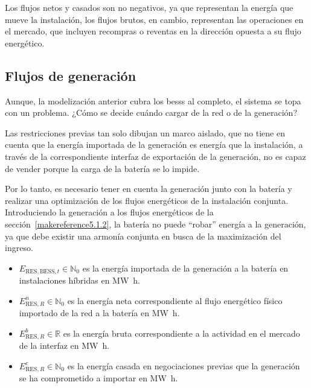 Los flujos netos y casados son no negativos, ya que representan la energía que mueve la instalación, los flujos brutos, en cambio, representan las operaciones en el mercado, que incluyen recompras o reventas en la dirección opuesta a su flujo energético.

\subsection{Flujos de generación}
\label{makereference5.1.3}

Aunque, la modelización anterior cubra los \glspl{bess} al completo, el sistema se topa con un problema. ¿Cómo se decide cuándo cargar de la red o de la generación?

Las restricciones previas tan solo dibujan un marco aislado, que no tiene en cuenta que la energía importada de la generación es energía que la instalación, a través de la correspondiente interfaz de exportación de la generación, no es capaz de vender porque la carga de la batería se lo impide.

Por lo tanto, es necesario tener en cuenta la generación junto con la batería y realizar una optimización de los flujos energéticos de la instalación conjunta. Introduciendo la generación a los flujos energéticos de la sección~\ref{makereference5.1.2}, la batería no puede ``robar'' energía a la generación, ya que debe existir una armonía conjunta en busca de la maximización del ingreso.

\begin{itemize}

  \item \( E_{\text{RES}, \text{BESS}, t} \in \mathbb{N}_{0} \) es la energía importada de la generación a la batería en instalaciones híbridas en \si{{\mega\watt\hour}}.

  \item \( E^{n}_{\text{RES}, R} \in \mathbb{N}_{0} \) es la energía neta correspondiente al flujo energético físico importado de la red a la batería en \si{{\mega\watt\hour}}.

  \item \( E^{b}_{\text{RES}, R} \in \mathbb{R} \) es la energía bruta correspondiente a la actividad en el mercado de la interfaz en \si{{\mega\watt\hour}}.

  \item \( E^{c}_{\text{RES}, R} \in \mathbb{N}_{0} \) es la energía casada en negociaciones previas que la generación se ha comprometido a importar en \si{{\mega\watt\hour}}.

\end{itemize}

